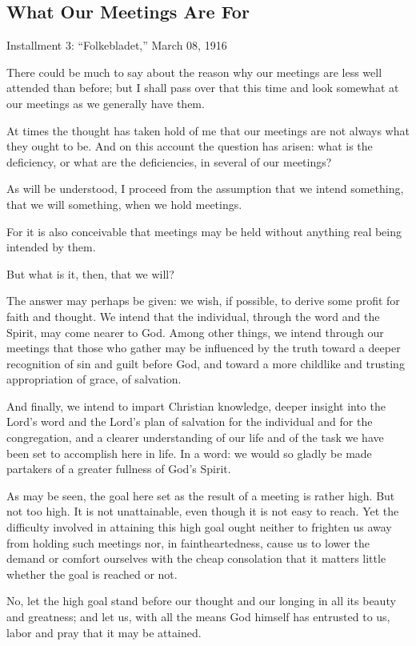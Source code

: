 \subsection{What Our Meetings Are For}

Installment 3: “Folkebladet,” March 08, 1916

There could be much to say about the reason why our meetings are less well attended than before; but I shall pass over that this time and look somewhat at our meetings as we generally have them.

At times the thought has taken hold of me that our meetings are not always what they ought to be. And on this account the question has arisen: what is the deficiency, or what are the deficiencies, in several of our meetings?

As will be understood, I proceed from the assumption that we intend something, that we will something, when we hold meetings.

For it is also conceivable that meetings may be held without anything real being intended by them.

But what is it, then, that we will?

The answer may perhaps be given: we wish, if possible, to derive some profit for faith and thought. We intend that the individual, through the word and the Spirit, may come nearer to God. Among other things, we intend through our meetings that those who gather may be influenced by the truth toward a deeper recognition of sin and guilt before God, and toward a more childlike and trusting appropriation of grace, of salvation.

And finally, we intend to impart Christian knowledge, deeper insight into the Lord’s word and the Lord’s plan of salvation for the individual and for the congregation, and a clearer understanding of our life and of the task we have been set to accomplish here in life. In a word: we would so gladly be made partakers of a greater fullness of God’s Spirit.

As may be seen, the goal here set as the result of a meeting is rather high. But not too high. It is not unattainable, even though it is not easy to reach. Yet the difficulty involved in attaining this high goal ought neither to frighten us away from holding such meetings nor, in faintheartedness, cause us to lower the demand or comfort ourselves with the cheap consolation that it matters little whether the goal is reached or not.

No, let the high goal stand before our thought and our longing in all its beauty and greatness; and let us, with all the means God himself has entrusted to us, labor and pray that it may be attained.

